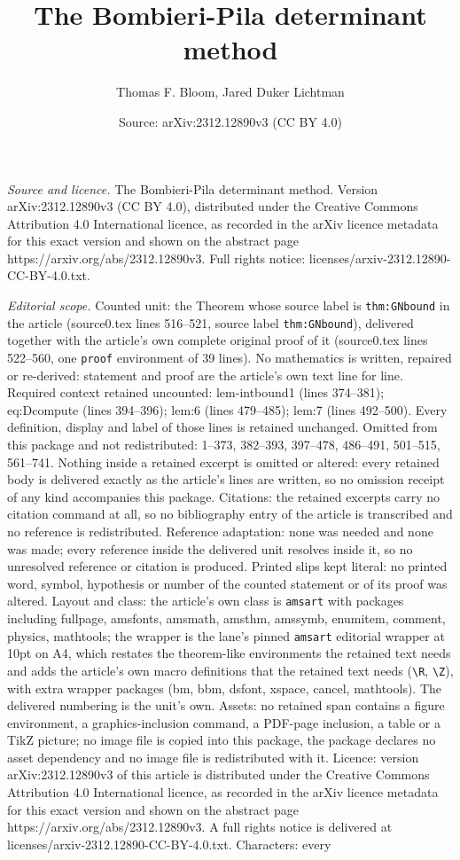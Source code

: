 \documentclass[10pt,a4paper]{amsart}
\title[The Bombieri-Pila determinant method]{The Bombieri-Pila determinant method}
\author{Thomas F. Bloom, Jared Duker Lichtman}
\date{Source: arXiv:2312.12890v3 (CC BY 4.0)}
\begin{document}
\maketitle

\noindent\emph{Source and licence.} The Bombieri-Pila determinant method. Version arXiv:2312.12890v3 (CC BY 4.0), distributed under the Creative Commons Attribution 4.0 International licence, as recorded in the arXiv licence metadata for this exact version and shown on the abstract page https://arxiv.org/abs/2312.12890v3. Full rights notice: licenses/arxiv-2312.12890-CC-BY-4.0.txt.\par\smallskip

\noindent\textit{Editorial scope.} Counted unit: the Theorem whose source label is \texttt{thm:GNbound} in the article (source0.tex lines 516--521, source label \texttt{thm:GNbound}), delivered together with the article's own complete original proof of it (source0.tex lines 522--560, one \texttt{proof} environment of 39 lines). No mathematics is written, repaired or re-derived: statement and proof are the article's own text line for line. Required context retained uncounted: lem-intbound1 (lines 374--381); eq:Dcompute (lines 394--396); lem:6 (lines 479--485); lem:7 (lines 492--500). Every definition, display and label of those lines is retained unchanged. Omitted from this package and not redistributed: 1--373, 382--393, 397--478, 486--491, 501--515, 561--741. Nothing inside a retained excerpt is omitted or altered: every retained body is delivered exactly as the article's lines are written, so no omission receipt of any kind accompanies this package. Citations: the retained excerpts carry no citation command at all, so no bibliography entry of the article is transcribed and no reference is redistributed. Reference adaptation: none was needed and none was made; every reference inside the delivered unit resolves inside it, so no unresolved reference or citation is produced. Printed slips kept literal: no printed word, symbol, hypothesis or number of the counted statement or of its proof was altered. Layout and class: the article's own class is \texttt{amsart} with packages including fullpage, amsfonts, amsmath, amsthm, amssymb, enumitem, comment, physics, mathtools; the wrapper is the lane's pinned \texttt{amsart} editorial wrapper at 10pt on A4, which restates the theorem-like environments the retained text needs and adds the article's own macro definitions that the retained text needs (\texttt{\textbackslash R}, \texttt{\textbackslash Z}), with extra wrapper packages (bm, bbm, dsfont, xspace, cancel, mathtools). The delivered numbering is the unit's own. Assets: no retained span contains a figure environment, a graphics-inclusion command, a PDF-page inclusion, a table or a TikZ picture; no image file is copied into this package, the package declares no asset dependency and no image file is redistributed with it. Licence: version arXiv:2312.12890v3 of this article is distributed under the Creative Commons Attribution 4.0 International licence, as recorded in the arXiv licence metadata for this exact version and shown on the abstract page https://arxiv.org/abs/2312.12890v3. A full rights notice is delivered at licenses/arxiv-2312.12890-CC-BY-4.0.txt. Characters: every 
\end{document}
